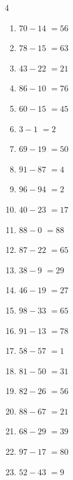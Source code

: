 \begin{multicols}{4}
\begin{enumerate}
  \item $70-14$
        $=56$

  \item $78-15$
        $=63$

  \item $43-22$
        $=21$

  \item $86-10$
        $=76$

  \item $60-15$
        $=45$

  \item $3-1$
        $=2$

  \item $69-19$
        $=50$

  \item $91-87$
        $=4$

  \item $96-94$
        $=2$

\columnbreak %

  \item $40-23$
        $=17$

  \item $88-0$
        $=88$

  \item $87-22$
        $=65$

  \item $38-9$
        $=29$

  \item $46-19$
        $=27$

  \item $98-33$
        $=65$

  \item $91-13$
        $=78$

  \item $58-57$
        $=1$

  \item $81-50$
        $=31$

  \item $82-26$
        $=56$

  \item $88-67$
        $=21$

  \item $68-29$
        $=39$

  \item $97-17$
        $=80$

  \item $52-43$
        $=9$


\end{enumerate}
\end{multicols}
